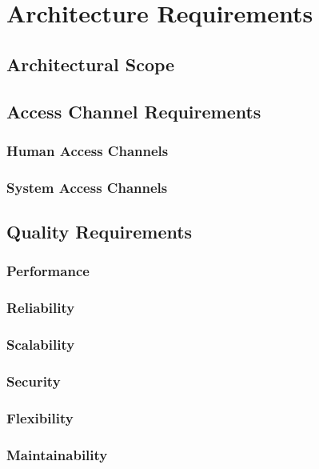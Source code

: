 \documentclass[11pt,fleqn]{book} %
\begin{document}

\chapter{Architecture Requirements}

	\section{Architectural Scope}
	\section{Access Channel Requirements}
		\subsection{Human Access Channels}
		\subsection{System Access Channels}

	\section{Quality Requirements}
		\subsection{Performance}
		\subsection{Reliability}
		\subsection{Scalability}
		\subsection{Security}
		\subsection{Flexibility}
		\subsection{Maintainability}
\end{document}
